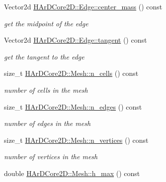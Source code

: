 \begin{DoxyCompactItemize}
Vector2d \hyperlink{group__Mesh_ga41ebc04d2b292197a02a9afd25a76a18}{H\+Ar\+D\+Core2\+D\+::\+Edge\+::center\+\_\+mass} () const
\begin{DoxyCompactList}\small\item\em get the midpoint of the edge \end{DoxyCompactList}\item 
\mbox{\label{group__Mesh_ga3362368ff28f1e128bbc46615fd24cd7}} 
Vector2d \hyperlink{group__Mesh_ga3362368ff28f1e128bbc46615fd24cd7}{H\+Ar\+D\+Core2\+D\+::\+Edge\+::tangent} () const
\begin{DoxyCompactList}\small\item\em get the tangent to the edge \end{DoxyCompactList}\item 
\mbox{\label{group__Mesh_ga2202a0715196c41356692d8adcfe3893}} 
size\+\_\+t \hyperlink{group__Mesh_ga2202a0715196c41356692d8adcfe3893}{H\+Ar\+D\+Core2\+D\+::\+Mesh\+::n\+\_\+cells} () const
\begin{DoxyCompactList}\small\item\em number of cells in the mesh \end{DoxyCompactList}\item 
\mbox{\label{group__Mesh_ga55a1cd5db98bbce8c73ab86b4527859c}} 
size\+\_\+t \hyperlink{group__Mesh_ga55a1cd5db98bbce8c73ab86b4527859c}{H\+Ar\+D\+Core2\+D\+::\+Mesh\+::n\+\_\+edges} () const
\begin{DoxyCompactList}\small\item\em number of edges in the mesh \end{DoxyCompactList}\item 
\mbox{\label{group__Mesh_gadb4a39bfc5444953e7799d28b8e37563}} 
size\+\_\+t \hyperlink{group__Mesh_gadb4a39bfc5444953e7799d28b8e37563}{H\+Ar\+D\+Core2\+D\+::\+Mesh\+::n\+\_\+vertices} () const
\begin{DoxyCompactList}\small\item\em number of vertices in the mesh \end{DoxyCompactList}\item 
\mbox{\label{group__Mesh_ga5f08b04ebac390a2ab8dfe956a90ebbf}} 
double \hyperlink{group__Mesh_ga5f08b04ebac390a2ab8dfe956a90ebbf}{H\+Ar\+D\+Core2\+D\+::\+Mesh\+::h\+\_\+max} () const

\end{DoxyCompactItemize}
